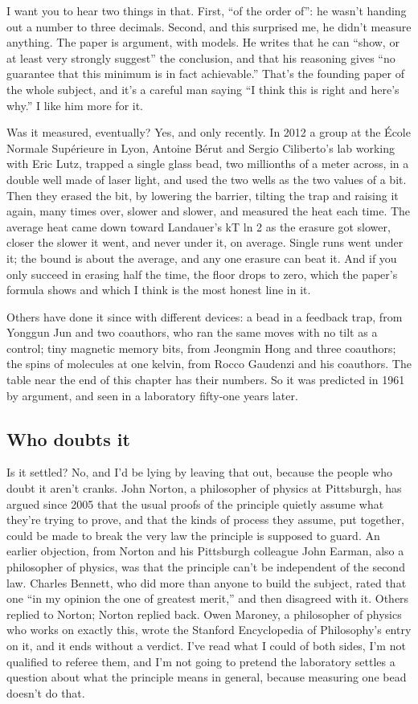 \documentclass[11pt,twoside]{article}
\theoremstyle{thielethm}
\theoremstyle{thieledef}
\theoremstyle{thieledef}
\theoremstyle{thieledef}
\theoremstyle{thielethm}
\theoremstyle{thieleobs}
\theoremstyle{thielethm}
\begin{document}
I want you to hear two things in that. First, ``of the order of'': he wasn't handing out a number to three decimals. Second, and this surprised me, he didn't measure anything. The paper is argument, with models. He writes that he can ``show, or at least very strongly suggest'' the conclusion, and that his reasoning gives ``no guarantee that this minimum is in fact achievable.'' That's the founding paper of the whole subject, and it's a careful man saying ``I think this is right and here's why.'' I like him more for it.

Was it measured, eventually? Yes, and only recently. In 2012 a group at the École Normale Supérieure in Lyon, Antoine Bérut and Sergio Ciliberto's lab working with Eric Lutz, trapped a single glass bead, two millionths of a meter across, in a double well made of laser light, and used the two wells as the two values of a bit. Then they erased the bit, by lowering the barrier, tilting the trap and raising it again, many times over, slower and slower, and measured the heat each time. The average heat came down toward Landauer's kT ln 2 as the erasure got slower, closer the slower it went, and never under it, on average. Single runs went under it; the bound is about the average, and any one erasure can beat it. And if you only succeed in erasing half the time, the floor drops to zero, which the paper's formula shows and which I think is the most honest line in it.

Others have done it since with different devices: a bead in a feedback trap, from Yonggun Jun and two coauthors, who ran the same moves with no tilt as a control; tiny magnetic memory bits, from Jeongmin Hong and three coauthors; the spins of molecules at one kelvin, from Rocco Gaudenzi and his coauthors. The table near the end of this chapter has their numbers. So it was predicted in 1961 by argument, and seen in a laboratory fifty-one years later.

\subsection{Who doubts it}

Is it settled? No, and I'd be lying by leaving that out, because the people who doubt it aren't cranks. John Norton, a philosopher of physics at Pittsburgh, has argued since 2005 that the usual proofs of the principle quietly assume what they're trying to prove, and that the kinds of process they assume, put together, could be made to break the very law the principle is supposed to guard. An earlier objection, from Norton and his Pittsburgh colleague John Earman, also a philosopher of physics, was that the principle can't be independent of the second law. Charles Bennett, who did more than anyone to build the subject, rated that one ``in my opinion the one of greatest merit,'' and then disagreed with it. Others replied to Norton; Norton replied back. Owen Maroney, a philosopher of physics who works on exactly this, wrote the Stanford Encyclopedia of Philosophy's entry on it, and it ends without a verdict. I've read what I could of both sides, I'm not qualified to referee them, and I'm not going to pretend the laboratory settles a question about what the principle means in general, because measuring one bead doesn't do that.
\end{document}
